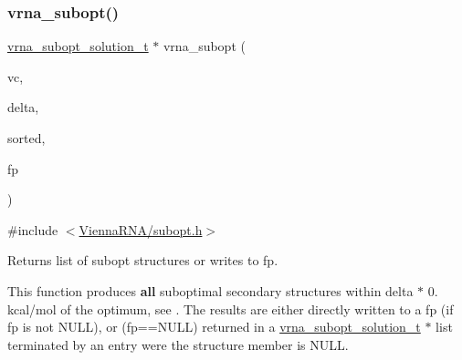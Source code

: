 \subsubsection{\texorpdfstring{vrna\_subopt()}{vrna\_subopt()}}
{\footnotesize\ttfamily \mbox{\hyperlink{subopt_8h_a01ae9a0f27d245d89f705afd843fc457}{vrna\+\_\+subopt\+\_\+solution\+\_\+t}} $\ast$ vrna\+\_\+subopt (\begin{DoxyParamCaption}\item[{\mbox{\hyperlink{group__fold__compound_ga1b0cef17fd40466cef5968eaeeff6166}{vrna\+\_\+fold\+\_\+compound\+\_\+t}} $\ast$}]{vc,  }\item[{int}]{delta,  }\item[{int}]{sorted,  }\item[{F\+I\+LE $\ast$}]{fp }\end{DoxyParamCaption})}



{\ttfamily \#include $<$\mbox{\hyperlink{subopt_8h}{Vienna\+R\+N\+A/subopt.\+h}}$>$}



Returns list of subopt structures or writes to fp. 

This function produces {\bfseries{all}} suboptimal secondary structures within \textquotesingle{}delta\textquotesingle{} $\ast$ 0. kcal/mol of the optimum, see \cite{wuchty:1999}. The results are either directly written to a \textquotesingle{}fp\textquotesingle{} (if \textquotesingle{}fp\textquotesingle{} is not N\+U\+LL), or (fp==N\+U\+LL) returned in a \mbox{\hyperlink{subopt_8h_a01ae9a0f27d245d89f705afd843fc457}{vrna\+\_\+subopt\+\_\+solution\+\_\+t}} $\ast$ list terminated by an entry were the \textquotesingle{}structure\textquotesingle{} member is N\+U\+LL.

